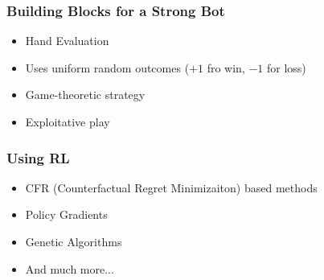 \documentclass[openany]{memoir}
\begin{document}
	\subsubsection{Building Blocks for a Strong Bot}
	\begin{itemize}
		\item Hand Evaluation
		\item Uses uniform random outcomes ($+1$ fro win, $-1$ for loss)
		\item Game-theoretic strategy
		\item Exploitative play
\end{itemize}
	\subsubsection{Using RL}
	\begin{itemize}
			\item CFR (Counterfactual Regret Minimizaiton) based methods
		\item Policy Gradients
		\item Genetic Algorithms
		\item And much more...
	\end{itemize}
\end{document}
